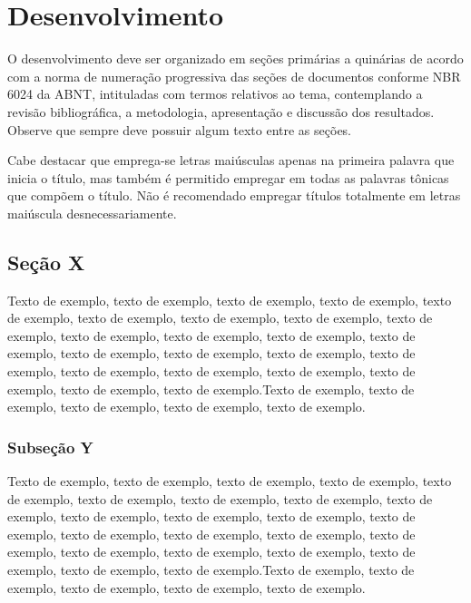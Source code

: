 \chapter{Desenvolvimento}\label{cap2}

O desenvolvimento deve ser organizado em seções primárias a quinárias de acordo com a norma de numeração progressiva das seções de documentos conforme NBR 6024 da ABNT, intituladas com termos relativos ao tema, contemplando a revisão bibliográfica, a metodologia, apresentação e discussão dos resultados. Observe que sempre deve possuir algum texto entre as seções.

Cabe destacar que emprega-se letras maiúsculas apenas na primeira palavra que inicia o título, mas também é permitido empregar em todas as palavras tônicas que compõem o título. Não é recomendado empregar títulos totalmente em letras maiúscula desnecessariamente.

\section{Seção X}

Texto de exemplo, texto de exemplo, texto de exemplo, texto de exemplo, texto de exemplo, texto de exemplo, texto de exemplo, texto de exemplo, texto de exemplo, texto de exemplo, texto de exemplo, texto de exemplo, texto de exemplo, texto de exemplo, texto de exemplo, texto de exemplo, texto de exemplo, texto de exemplo, texto de exemplo, texto de exemplo, texto de exemplo, texto de exemplo, texto de exemplo.Texto de exemplo, texto de exemplo, texto de exemplo, texto de exemplo, texto de exemplo.

\subsection{Subseção Y}

Texto de exemplo, texto de exemplo, texto de exemplo, texto de exemplo, texto de exemplo, texto de exemplo, texto de exemplo, texto de exemplo, texto de exemplo, texto de exemplo, texto de exemplo, texto de exemplo, texto de exemplo, texto de exemplo, texto de exemplo, texto de exemplo, texto de exemplo, texto de exemplo, texto de exemplo, texto de exemplo, texto de exemplo, texto de exemplo, texto de exemplo.Texto de exemplo, texto de exemplo, texto de exemplo, texto de exemplo, texto de exemplo.

